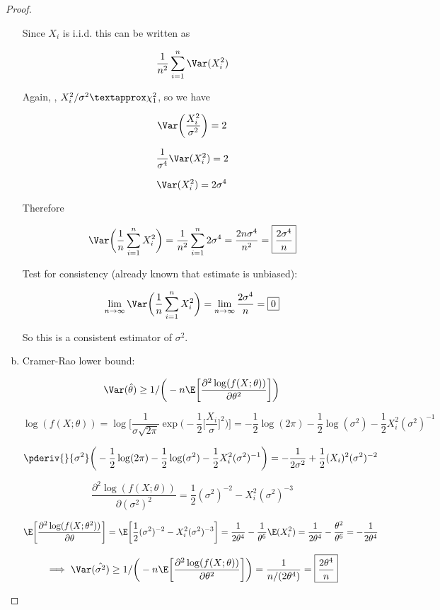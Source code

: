 \begin{proof}
\begin{enumerate}[a.]
Since \(X_i\) is i.i.d. this can be written as 

\[
\frac{1}{n^2} \sum_{i=1}^n \Var (X_i^2 )
\]

Again, , \(X_i^2/\sigma^2 \textapprox \chi_1^2\), so we have

\[
\Var\bigg( \frac{X_i^2}{\sigma^2} \bigg) = 2
\]

\[
\frac{1}{\sigma^4} \Var(X_i^2) = 2
\]

\[
\Var(X_i^2) = 2 \sigma^4
\]

Therefore

\[
\Var \bigg( \frac{1}{n} \sum_{i=1}^n X_i^2 \bigg) = \frac{1}{n^2} \sum_{i=1}^n 2 \sigma^4 = \frac{2n\sigma^4}{n^2} = \boxed{ \frac{2 \sigma^4}{n}}
\]

Test for consistency (already known that estimate is unbiased):

\[
\lim_{n \to \infty} \Var \bigg( \frac{1}{n} \sum_{i=1}^n X_i^2 \bigg) = \lim_{n \to \infty} \frac{2 \sigma^4}{n} = \boxed{0}
\]

So this is a consistent estimator of \(\sigma^2\).

\item Cramer-Rao lower bound:

\[
\Var(\hat{\theta}) \geq 1/\bigg(-n \E \bigg[ \frac{\partial^2 \log(f(X; \theta))}{\partial \theta^2} \bigg] \bigg)
\]

\[
 \log(f(X; \theta)) = \log \bigg[ \frac{1}{\sigma \sqrt{2 \pi}} \exp\bigg(- \frac{1}{2} \bigg[\frac{X_i}{\sigma}\bigg]^2 \bigg) \bigg] = - \frac{1}{2} \log(2 \pi) -  \frac{1}{2} \log(\sigma^2) - \frac{1}{2}X_i^2 (\sigma^2)^{-1}
\]

\[
\pderiv{}{\sigma^2}\bigg( - \frac{1}{2} \log(2 \pi) -  \frac{1}{2} \log(\sigma^2) - \frac{1}{2}X_i^2 (\sigma^2)^{-1}\bigg) = -\frac{1}{2 \sigma^2} + \frac{1}{2}(X_i)^2 (\sigma^2)^{-2}
\]

\[
 \frac{\partial^2 \log(f(X; \theta))}{\partial (\sigma^2)^2} = \frac{1}{2}(\sigma^2)^{-2}  - X_i^2(\sigma^2)^{-3}
\]

\[
\E \bigg[  \frac{\partial^2 \log(f(X; \theta^2))}{\partial \theta}  \bigg] = \E \bigg[  \frac{1}{2}(\sigma^2)^{-2}  - X_i^2(\sigma^2)^{-3}  \bigg] = \frac{1}{2 \theta^4} - \frac{1}{\theta^6} \E(X_i^2) = \frac{1}{2 \theta^4} - \frac{\theta^2}{\theta^6} = -\frac{1}{2 \theta^4}
\]

\[
\implies \Var(\hat{\sigma^2}) \geq 1/\bigg(-n \E \bigg[ \frac{\partial^2 \log(f(X; \theta))}{\partial \theta^2} \bigg] \bigg) = \frac{1}{n/(2 \theta^4)} = \boxed{\frac{2 \theta^4}{n}}
\]


\end{enumerate}
\end{proof}
